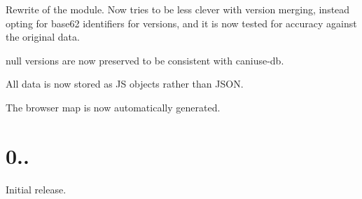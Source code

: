 \begin{DoxyItemize}
\item Rewrite of the module. Now tries to be less clever with version merging, instead opting for base62 identifiers for versions, and it is now tested for accuracy against the original data.
\item {\ttfamily null} versions are now preserved to be consistent with caniuse-\/db.
\item All data is now stored as JS objects rather than J\+S\+ON.
\item The browser map is now automatically generated.
\end{DoxyItemize}

\section*{0..}


\begin{DoxyItemize}
\item Initial release. 
\end{DoxyItemize}